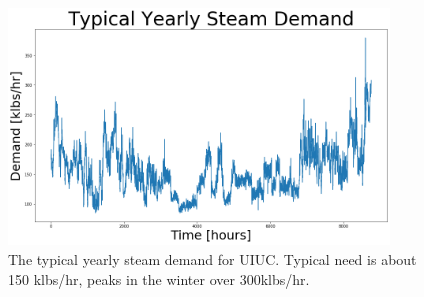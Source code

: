 \begin{frame}

	\begin{figure}
		\centering
		\includegraphics[width=0.9\textwidth]{./images/typical_steam.png}
		\caption*{The typical yearly steam demand for UIUC. Typical need is about 150 klbs/hr, peaks in the winter over 300klbs/hr.}
	\end{figure}

	
\end{frame}
